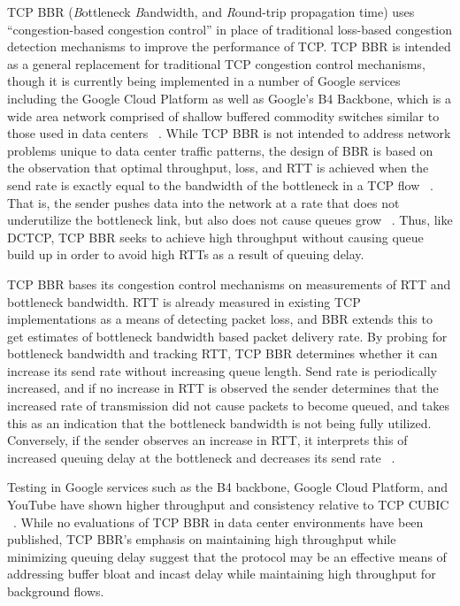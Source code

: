 TCP BBR (\emph{B}ottleneck \emph{B}andwidth, and \emph{R}ound-trip propagation time) uses ``congestion-based congestion control'' in place of traditional loss-based congestion detection mechanisms to improve the performance of TCP. TCP BBR is intended as a general replacement for traditional TCP congestion control mechanisms, though it is currently being implemented in a number of Google services including the Google Cloud Platform as well as Google's B4 Backbone, which is a wide area network comprised of shallow buffered commodity switches similar to those used in data centers ~\cite{cardwell_bbr:_2016, cardwell_tcp_2017}. While TCP BBR is not intended to address network problems unique to data center traffic patterns, the design of BBR is based on the observation that optimal throughput, loss, and RTT is achieved when the send rate is exactly equal to the bandwidth of the bottleneck in a TCP flow ~\cite{kleinrock_power_1979}. That is, the sender pushes data into the network at a rate that does not underutilize the bottleneck link, but also does not cause queues grow ~\cite{cardwell_bbr:_2016}. Thus, like DCTCP, TCP BBR seeks to achieve high throughput without causing queue build up in order to avoid high RTTs as a result of queuing delay.

TCP BBR bases its congestion control mechanisms on measurements of RTT and bottleneck bandwidth. RTT is already measured in existing TCP implementations as a means of detecting packet loss, and BBR extends this to get estimates of bottleneck bandwidth based packet delivery rate. By probing for bottleneck bandwidth and tracking RTT, TCP BBR determines whether it can increase its send rate without increasing queue length. Send rate is periodically increased, and if no increase in RTT is observed the sender determines that the increased rate of transmission did not cause packets to become queued, and takes this as an indication that the bottleneck bandwidth is not being fully utilized. Conversely, if the sender observes an increase in RTT, it interprets this of increased queuing delay at the bottleneck and decreases its send rate ~\cite{cardwell_bbr:_2016}. 

Testing in Google services such as the B4 backbone, Google Cloud Platform, and YouTube have shown higher throughput and consistency relative to TCP CUBIC ~\cite{cardwell_bbr:_2016, cardwell_tcp_2017}. While no evaluations of TCP BBR in data center environments have been published, TCP BBR's emphasis on maintaining high throughput while minimizing queuing delay suggest that the protocol may be an effective means of addressing buffer bloat and incast delay while maintaining high throughput for background flows.

